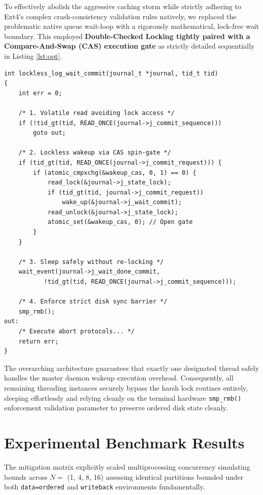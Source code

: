 \documentclass[10pt,a4paper,twocolumn]{article}
\begin{document}
To effectively abolish the aggressive caching storm while strictly adhering to Ext4's complex crash-consistency validation rules natively, we replaced the problematic native queue wait-loop with a rigorously mathematical, lock-free wait boundary. This employed \textbf{Double-Checked Locking tightly paired with a Compare-And-Swap (CAS) execution gate} as strictly detailed sequentially in Listing \ref{lst:opt}.

\begin{lstlisting}[caption={Optimized CAS Lockless Implementation}, label={lst:opt}]
int lockless_log_wait_commit(journal_t *journal, tid_t tid)
{
    int err = 0;
    
    /* 1. Volatile read avoiding lock access */
    if (!tid_gt(tid, READ_ONCE(journal->j_commit_sequence)))
        goto out;

    /* 2. Lockless wakeup via CAS spin-gate */
    if (tid_gt(tid, READ_ONCE(journal->j_commit_request))) {
        if (atomic_cmpxchg(&wakeup_cas, 0, 1) == 0) {
            read_lock(&journal->j_state_lock);
            if (tid_gt(tid, journal->j_commit_request))
                wake_up(&journal->j_wait_commit);
            read_unlock(&journal->j_state_lock);
            atomic_set(&wakeup_cas, 0); // Open gate
        }
    }

    /* 3. Sleep safely without re-locking */
    wait_event(journal->j_wait_done_commit,
           !tid_gt(tid, READ_ONCE(journal->j_commit_sequence)));
           
    /* 4. Enforce strict disk sync barrier */
    smp_rmb();
out:
    /* Execute abort protocols... */
    return err;
}
\end{lstlisting}

The overarching architecture guarantees that exactly one designated thread safely handles the master daemon wakeup execution overhead. Consequently, all remaining threading instances securely bypass the harsh lock routines entirely, sleeping effortlessly and relying cleanly on the terminal hardware \texttt{smp\_rmb()} enforcement validation parameter to preserve ordered disk state cleanly.

\section{Experimental Benchmark Results}
\label{sec:results}

The mitigation matrix explicitly scaled multiprocessing concurrency simulating bounds across $N=$ (1, 4, 8, 16) assessing identical partitions bounded under both \texttt{data=ordered} and \texttt{writeback} environments fundamentally.
\end{document}
